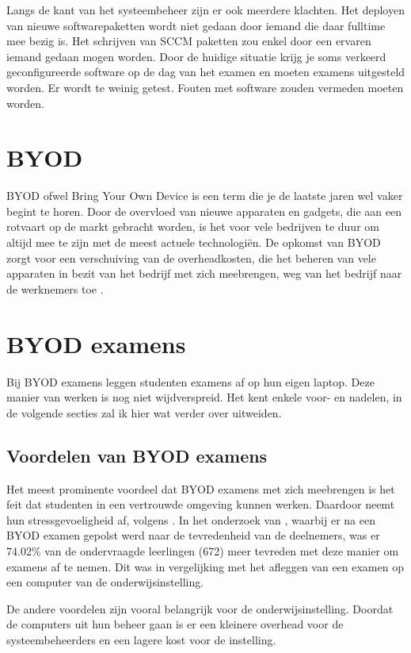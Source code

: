 Langs de kant van het systeembeheer zijn er ook meerdere klachten. Het deployen van nieuwe softwarepaketten wordt niet gedaan door iemand die daar fulltime mee bezig is. Het schrijven van SCCM paketten zou enkel door een ervaren iemand gedaan mogen worden.  Door de huidige situatie krijg je soms verkeerd geconfigureerde software op de dag van het examen en moeten examens uitgesteld worden. Er wordt te weinig getest. Fouten met software zouden vermeden moeten worden. 

\section{BYOD}

BYOD ofwel Bring Your Own Device is een term die je de laatste jaren wel vaker begint te horen. Door de overvloed van nieuwe apparaten en gadgets, die aan een rotvaart op de markt gebracht worden, is het voor vele bedrijven te duur om altijd mee te zijn met de meest actuele technologiën. De opkomst van BYOD zorgt voor een verschuiving van de overheadkosten, die het beheren van vele apparaten in bezit van het bedrijf met zich meebrengen, weg van het bedrijf naar de werknemers toe \autocite{Hong2016}.

\section{BYOD examens}
Bij BYOD examens leggen studenten examens af op hun eigen laptop. Deze manier van werken is nog niet wijdverspreid. Het kent enkele voor- en nadelen, in de volgende secties zal ik hier wat verder over uitweiden. 

\subsection{Voordelen van BYOD examens}
Het meest prominente voordeel dat BYOD examens met zich meebrengen is het feit dat studenten in een vertrouwde omgeving kunnen werken. Daardoor neemt hun stressgevoeligheid af, volgens
\textcite{TeckSwee2014}. In het onderzoek van \textcite{TeckSwee2014}, waarbij er na een BYOD examen gepolst werd naar de tevredenheid van de deelnemers, was er 74.02\% van de ondervraagde leerlingen (672) meer tevreden met deze manier om examens af te nemen. Dit was in vergelijking met het afleggen van een examen op een computer van de onderwijsinstelling. 

De andere voordelen zijn vooral belangrijk voor de onderwijsinstelling. Doordat de computers uit hun beheer gaan is er een kleinere overhead voor de systeembeheerders en een lagere kost voor de instelling.

